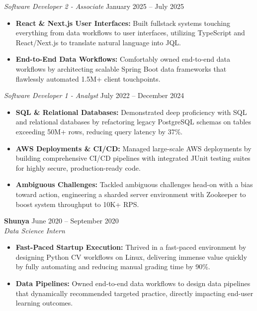 \documentclass[11pt,a4paper]{article}
\begin{document}
\vspace{3pt}
\noindent
\textit{Software Developer 2 - Associate} \hfill January 2025 -- July 2025
\begin{itemize}[leftmargin=*,noitemsep,topsep=0pt]
    \item \textbf{React \& Next.js User Interfaces:} Built fullstack systems touching everything from data workflows to user interfaces, utilizing TypeScript and React/Next.js to translate natural language into JQL.
    \item \textbf{End-to-End Data Workflows:} Comfortably owned end-to-end data workflows by architecting scalable Spring Boot data frameworks that flawlessly automated 1.5M+ client touchpoints.
\end{itemize}

\vspace{3pt}
\noindent
\textit{Software Developer 1 - Analyst} \hfill July 2022 -- December 2024
\begin{itemize}[leftmargin=*,noitemsep,topsep=0pt]
    \item \textbf{SQL \& Relational Databases:} Demonstrated deep proficiency with SQL and relational databases by refactoring legacy PostgreSQL schemas on tables exceeding 50M+ rows, reducing query latency by 37\%.
    \item \textbf{AWS Deployments \& CI/CD:} Managed large-scale AWS deployments by building comprehensive CI/CD pipelines with integrated JUnit testing suites for highly secure, production-ready code.
    \item \textbf{Ambiguous Challenges:} Tackled ambiguous challenges head-on with a bias toward action, engineering a sharded server environment with Zookeeper to boost system throughput to 10K+ RPS.
\end{itemize}

\vspace{3pt}
\noindent
\textbf{Shunya} \hfill June 2020 -- September 2020 \\
\textit{Data Science Intern}
\begin{itemize}[leftmargin=*,noitemsep,topsep=0pt]
    \item \textbf{Fast-Paced Startup Execution:} Thrived in a fast-paced environment by designing Python CV workflows on Linux, delivering immense value quickly by fully automating and reducing manual grading time by 90\%.
    \item \textbf{Data Pipelines:} Owned end-to-end data workflows to design data pipelines that dynamically recommended targeted practice, directly impacting end-user learning outcomes.
\end{itemize}
\end{document}
